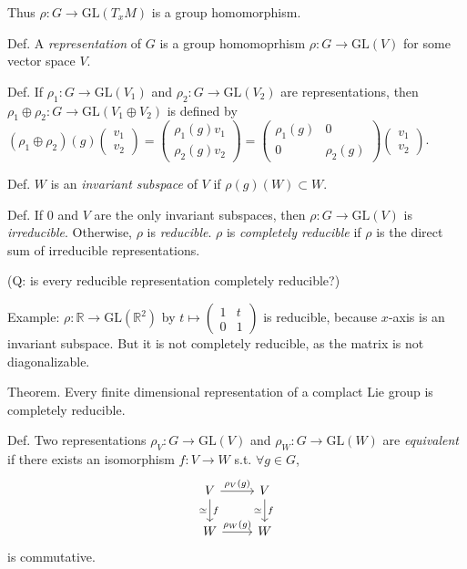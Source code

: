 \documentclass{article}
\theoremstyle{mystyle}
\theoremstyle{remark}
\numberwithin{equation}{section}
\begin{document}
Thus $\rho\colon G\rightarrow \mathrm{GL}(T_xM)$ is a group homomorphism.

Def. A \emph{representation} of $G$ is a group homomoprhism $\rho\colon G\rightarrow \mathrm{GL}(V)$ for some vector space $V$.

Def. If $\rho_1\colon G\rightarrow \mathrm{GL}(V_1)$ and $\rho_2\colon G\rightarrow \mathrm{GL}(V_2)$ are representations, then $\rho_1\oplus \rho_2\colon G\rightarrow \mathrm{GL}(V_1\oplus V_2)$ is defined by $(\rho_1\oplus \rho_2)(g) \begin{pmatrix} v_1\\v_2 \end{pmatrix}
=
\begin{pmatrix} \rho_1(g)v_1 \\ \rho_2(g)v_2 \end{pmatrix}
=
\begin{pmatrix} \rho_1(g) & 0 \\0&\rho_2(g)\end{pmatrix} \begin{pmatrix}v_1 \\ v_2 \end{pmatrix}$.

Def. $W$ is an \emph{invariant subspace} of $V$ if $\rho(g)(W) \subset W$. 

Def. If $0$ and $V$ are the only invariant subspaces, then $\rho\colon G\rightarrow \mathrm{GL}(V)$ is \emph{irreducible}. Otherwise, $\rho$ is \emph{reducible}. $\rho$ is \emph{completely reducible} if $\rho$ is the direct sum of irreducible representations.

(Q: is every reducible representation completely reducible?)


Example: $\rho\colon \mathbb{R}\rightarrow \mathrm{GL}(\mathbb{R}^2)$ by $t\mapsto \begin{pmatrix} 1 & t \\ 0 & 1\end{pmatrix}$ is reducible, because $x$-axis is an invariant subspace. But it is not completely reducible, as the matrix is not diagonalizable.


Theorem. Every finite dimensional representation of a complact Lie group is completely reducible.



Def. Two representations $\rho_V\colon G\rightarrow \mathrm{GL}(V)$ and $\rho_W\colon G\rightarrow \mathrm{GL}(W)$ are \emph{equivalent} if there exists an isomorphism $f\colon V\rightarrow W$ s.t. $\forall g \in G$, 
$$\begin{tikzcd} V\ar[r,"\rho_V(g)"] \ar[d,"f","\simeq "'] & V \ar[d, "f","\simeq "'] \\
W \ar[r,"\rho_W(g)"] & W \end{tikzcd}
$$
is commutative.
\end{document}
